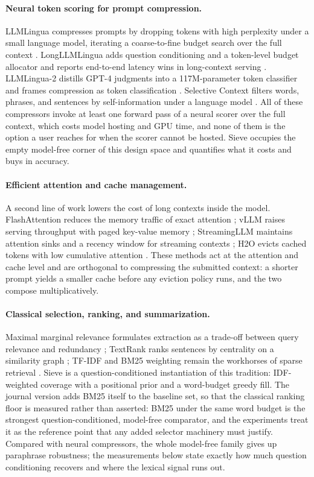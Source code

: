 \documentclass[preprint,12pt]{elsarticle}
\theoremstyle{remark}
\newcommand{\method}{Sieve}
\begin{document}
\paragraph{Neural token scoring for prompt compression.}
LLMLingua compresses prompts by dropping tokens with high perplexity
under a small language model, iterating a coarse-to-fine budget search
over the full context \citep{jiang2023llmlingua}. LongLLMLingua adds
question conditioning and a token-level budget allocator and reports
end-to-end latency wins in long-context serving
\citep{jiang2023longllmlingua}. LLMLingua-2 distills GPT-4 judgments
into a 117M-parameter token classifier and frames compression as token
classification \citep{pan2024llmlingua2}. Selective Context filters
words, phrases, and sentences by self-information under a language
model \citep{li2023selective}. All of these compressors invoke at
least one forward pass of a neural scorer over the full context, which
costs model hosting and GPU time, and none of them is the option a
user reaches for when the scorer cannot be hosted. \method{} occupies
the empty model-free corner of this design space and quantifies what
it costs and buys in accuracy.

\paragraph{Efficient attention and cache management.}
A second line of work lowers the cost of long contexts inside the
model. FlashAttention reduces the memory traffic of exact attention
\citep{dao2022flashattention}; vLLM raises serving throughput with
paged key-value memory \citep{kwon2023vllm}; StreamingLLM maintains
attention sinks and a recency window for streaming contexts
\citep{xiao2023streaming}; H2O evicts cached tokens with low
cumulative attention \citep{zhang2023h2o}. These methods act at the
attention and cache level and are orthogonal to compressing the
submitted context: a shorter prompt yields a smaller cache before any
eviction policy runs, and the two compose multiplicatively.

\paragraph{Classical selection, ranking, and summarization.}
Maximal marginal relevance formulates extraction as a trade-off
between query relevance and redundancy \citep{carbonell1998mmr};
TextRank ranks sentences by centrality on a similarity graph
\citep{mihalcea2004textrank}; TF-IDF and BM25 weighting remain the
workhorses of sparse retrieval \citep{robertson2009bm25}. \method{} is
a question-conditioned instantiation of this tradition: IDF-weighted
coverage with a positional prior and a word-budget greedy fill. The
journal version adds BM25 itself to the baseline set, so that the
classical ranking floor is measured rather than asserted: BM25 under
the same word budget is the strongest question-conditioned,
model-free comparator, and the experiments treat it as the reference
point that any added selector machinery must justify. Compared with
neural compressors, the whole model-free family gives up paraphrase
robustness; the measurements below state exactly how much question
conditioning recovers and where the lexical signal runs out.
\end{document}
